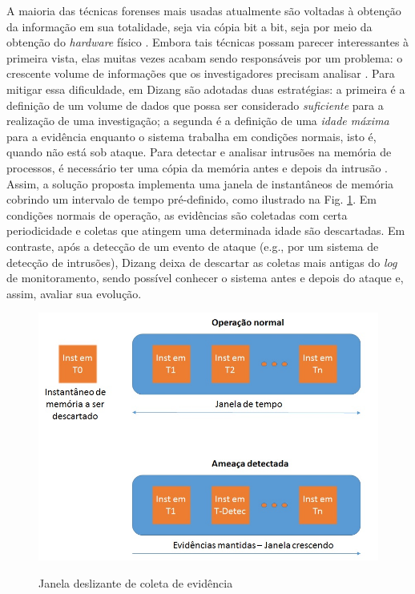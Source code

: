 \documentclass[conference]{IEEEtran}
\newcommand{\marcosR}[1]{{\color{brown}{COMMENT: #1}}}
\newcommand{\fancyname}{Dizang }
\begin{document}
A maioria das técnicas forenses mais usadas atualmente são voltadas à obtenção da informação em sua totalidade, seja via cópia bit a bit, seja por meio da obtenção do \textit{hardware} físico \cite{Simou_Cloud_Chlng:2014} \cite{Bem_Past_Present_Future:2008}. 
%
Embora tais técnicas possam parecer interessantes à primeira vista, elas muitas vezes acabam sendo responsáveis por um problema: o crescente volume de informações que os investigadores precisam analisar \cite{Quick_Increase_Volume_Impact:2014}.
%
Para mitigar essa dificuldade, em \fancyname são adotadas duas estratégias: a primeira é a definição de um volume de dados que possa ser considerado \textit{suficiente} para a realização de uma investigação; a segunda é a definição de uma \textit{idade máxima} para a evidência enquanto o sistema trabalha em condições normais, isto é, quando não está sob ataque.
%
Para detectar e analisar intrusões na memória de processos, é necessário ter uma cópia da memória antes e depois da intrusão \cite{Case_Memory_Forensics:2014}. 
%
Assim, a solução proposta implementa uma janela de instantâneos de memória cobrindo um intervalo de tempo pré-definido, como ilustrado na Fig. \ref{fig:janela}. 
%
Em condições normais de operação, as evidências são coletadas com certa periodicidade e coletas que atingem uma determinada idade são descartadas.
%
Em contraste, após a detecção de um evento de ataque (e.g., por um sistema de detecção de intrusões), \fancyname deixa de descartar as coletas mais antigas do \textit{log} de monitoramento, sendo possível conhecer o sistema antes e depois do ataque e, assim, avaliar sua evolução.
%
%

\begin{figure}[htb!]
\footnotesize
\caption{Janela deslizante de coleta de evidência}
\includegraphics[scale=0.40]{janela_ieee.jpg}
\centering
\label{fig:janela}
\end{figure}
\end{document}
